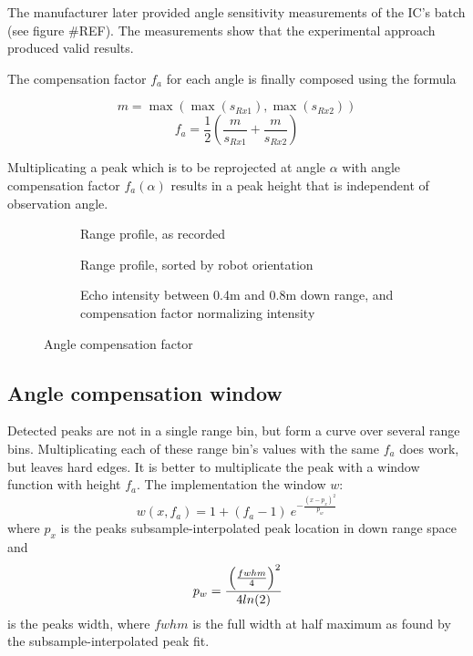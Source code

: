 The manufacturer later provided angle sensitivity measurements of the
IC's batch (see figure \#REF). The measurements show that the
experimental approach produced valid results.

The compensation factor \(f_a\) for each angle is finally composed using
the formula

\[m = \max \left( \max (s_{Rx1}), \max (s_{Rx2}) \right)\] \[
f_a = \frac{1}{2}
  \left(
    \frac{m}{ s_{Rx1} } +
    \frac{m}{ s_{Rx2} }
  \right)
\]

Multiplicating a peak which is to be reprojected at angle \(\alpha\)
with angle compensation factor \(f_a(\alpha)\) results in a peak height
that is independent of observation angle.

\begin{figure}[htbp]
    \centering
    \label{fig:fig_angle_compensation}
    \begin{subfigure}{\textwidth}
        \centering
        \def\svgscale{0.8} \small
        
        \caption{Range profile, as recorded}
        \bigskip
    \end{subfigure}
    \begin{subfigure}{\textwidth}
        \centering
        \def\svgscale{0.8} \small
        
        \caption{Range profile, sorted by robot orientation}
        \bigskip
    \end{subfigure}
    \begin{subfigure}{\textwidth}
        \centering
        \def\svgscale{0.8} \small
        
        \caption{Echo intensity between 0.4m and 0.8m down range, and compensation factor normalizing intensity}
        \bigskip
    \end{subfigure}
    \caption{Angle compensation factor}
\end{figure}

\subsection{Angle compensation
window}\label{angle-compensation-window}

Detected peaks are not in a single range bin, but form a curve over
several range bins. Multiplicating each of these range bin's values with
the same \(f_a\) does work, but leaves hard edges. It is better to
multiplicate the peak with a window function with height \(f_a\). The
implementation the window \(w\): \[
w(x,f_a) = 1 + (f_a - 1)
~e ^ {
 -\frac{ \left( {x - p_x} \right) ^ 2 }
       {p_w}
}
\] where \(p_x\) is the peaks subsample-interpolated peak location in
down range space and
$$
p_w = \cfrac{
\left( \frac{fwhm}{4}  \right) ^2
}{
4 ln(2)}
$$ is
the peaks width, where \(fwhm\) is the full width at half maximum as
found by the subsample-interpolated peak fit.

